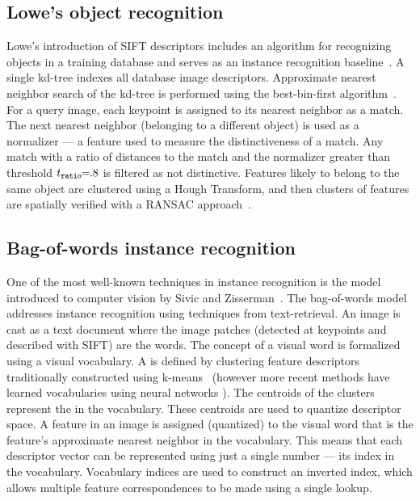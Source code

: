         \figSVInlier{}

        \FloatBarrier{}

    \subsection{Lowe's object recognition}

        Lowe's introduction of SIFT descriptors includes an algorithm for recognizing objects in a training
        database and serves as an instance recognition baseline~\cite{lowe_distinctive_2004}. A single kd-tree
        indexes all database image descriptors. Approximate nearest neighbor search of the kd-tree is performed
        using the best-bin-first algorithm~\cite{beis_shape_1997}. For a query image, each keypoint is assigned to
        its nearest neighbor as a match. The next nearest neighbor (belonging to a different object) is used as a
        normalizer --- a feature used to measure the distinctiveness of a match. Any match with a ratio of
        distances to the match and the normalizer greater than threshold $t_{\tt{ratio}}\mkern-6mu=\mkern-6mu.8$ is filtered as
        not distinctive. Features likely to belong to the same object are clustered using a Hough Transform, and
        then clusters of features are spatially verified with a RANSAC approach~\cite{fischler_random_1981}.


    \subsection{Bag-of-words instance recognition}\label{subsec:bow}

        One of the most well-known techniques in instance recognition is the  model
        introduced to computer vision by Sivic and Zisserman~\cite{sivic_video_2003, sivic_efficient_2009}. The
        bag-of-words model addresses instance recognition using techniques from text-retrieval. An image is cast as
        a text document where the image patches (detected at keypoints and described with SIFT) are the words. The
        concept of a visual word is formalized using a visual vocabulary. A  is
        defined by clustering feature descriptors traditionally constructed using k-means~\cite{lloyd_least_1982}
        (however more recent methods have learned vocabularies using neural networks
        \cite{arandjelovic_netvlad_2016}). The centroids of the clusters represent the  in
        the vocabulary. These centroids are used to quantize descriptor space. A feature in an image is assigned
        (quantized) to the visual word that is the feature's approximate nearest neighbor in the vocabulary. This
        means that each descriptor vector can be represented using just a single number --- \ie{} its index in the
        vocabulary. Vocabulary indices are used to construct an inverted index, which allows multiple feature
        correspondences to be made using a single lookup.

